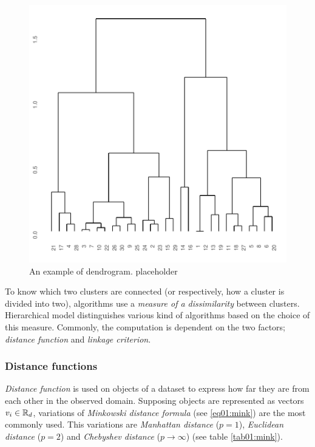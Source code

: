 \begin{figure}\centering
	\includegraphics[width=\linewidth]{img/dendro}
	\caption{An example of dendrogram. placeholder }
	\label{fig01:dendro}
\end{figure}

To know which two clusters are connected (or respectively, how a cluster is divided into two), algorithms use a \emph{measure of a dissimilarity} between clusters.  
Hierarchical model distinguishes various kind of algorithms based on the choice of this measure. Commonly, the computation is dependent on the two factors; \emph{distance function} and \emph{linkage criterion}. 

\subsubsection{Distance functions}

\emph{Distance function} is used on objects of a dataset to express how far they are from each other in the observed domain. Supposing objects are represented as vectors $v_i \in \mathbb{R}_d$, variations of \emph{Minkowski distance formula} (see \ref{eq01:mink}) are the most commonly used.
This variations are \emph{Manhattan distance} ($p=1$), \emph{Euclidean distance} ($p=2$) and \emph{Chebyshev distance} ($p \to \infty$) (see table \ref{tab01:mink}).

